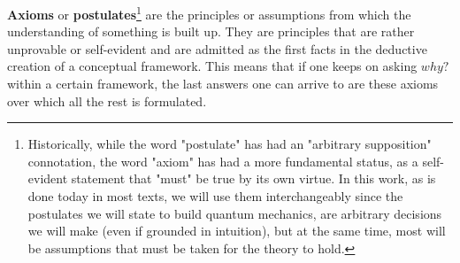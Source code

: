\documentclass[11pt, a4paper]{article} %
\begin{document}
{\bf Axioms} or {\bf postulates}\footnote{Historically, while the word  "postulate" has had an "arbitrary supposition" connotation, the word "axiom" has had a more fundamental status, as a self-evident statement that "must" be true by its own virtue. In this work, as is done today in most texts, we will use them interchangeably since the postulates we will state to build quantum mechanics, are arbitrary decisions we will make (even if grounded in intuition), but at the same time, most will be assumptions that must be taken for the theory to hold.  } are the principles or assumptions from which the understanding of something is built up. They are principles that are rather unprovable or self-evident and are admitted as the first facts in the deductive creation of a conceptual framework. This means that if one keeps on asking $why?$ within a certain framework, the last answers one can arrive to are these axioms over which all the rest is formulated. \vspace{0.2cm}
\end{document}
